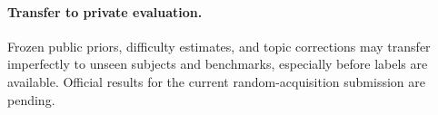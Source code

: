 \paragraph{Transfer to private evaluation.} Frozen public priors, difficulty estimates, and topic corrections may transfer imperfectly to unseen subjects and benchmarks, especially before labels are available. Official results for the current random-acquisition submission are pending.
